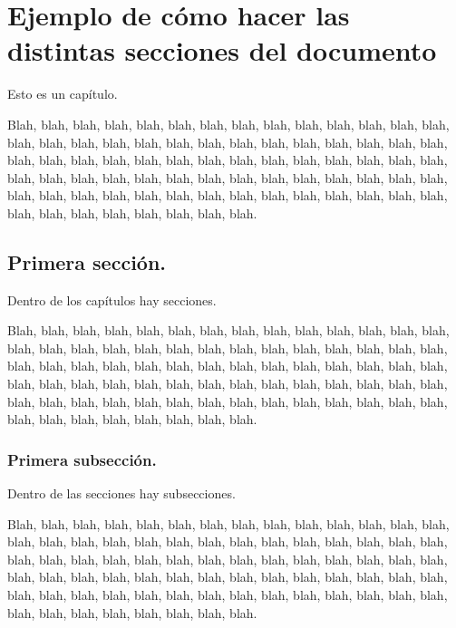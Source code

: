 \chapter{Ejemplo de cómo hacer las distintas secciones del documento}

Esto es un capítulo.

Blah, blah, blah, blah, blah, blah, blah, blah, blah, blah, blah, blah, blah,
blah, blah, blah, blah, blah, blah, blah, blah, blah, blah, blah, blah, blah,
blah, blah, blah, blah, blah, blah, blah, blah, blah, blah, blah, blah, blah,
blah, blah, blah, blah, blah, blah, blah, blah, blah, blah, blah, blah, blah,
blah, blah, blah, blah, blah, blah, blah, blah, blah, blah, blah, blah, blah,
blah, blah, blah, blah, blah, blah, blah, blah, blah, blah, blah, blah, blah.

\section{Primera sección.}

Dentro de los capítulos hay secciones.

Blah, blah, blah, blah, blah, blah, blah, blah, blah, blah, blah, blah, blah,
blah, blah, blah, blah, blah, blah, blah, blah, blah, blah, blah, blah, blah,
blah, blah, blah, blah, blah, blah, blah, blah, blah, blah, blah, blah, blah,
blah, blah, blah, blah, blah, blah, blah, blah, blah, blah, blah, blah, blah,
blah, blah, blah, blah, blah, blah, blah, blah, blah, blah, blah, blah, blah,
blah, blah, blah, blah, blah, blah, blah, blah, blah, blah, blah, blah, blah.

\subsection{Primera subsección.}

Dentro de las secciones  hay subsecciones.

Blah, blah, blah, blah, blah, blah, blah, blah, blah, blah, blah, blah, blah,
blah, blah, blah, blah, blah, blah, blah, blah, blah, blah, blah, blah, blah,
blah, blah, blah, blah, blah, blah, blah, blah, blah, blah, blah, blah, blah,
blah, blah, blah, blah, blah, blah, blah, blah, blah, blah, blah, blah, blah,
blah, blah, blah, blah, blah, blah, blah, blah, blah, blah, blah, blah, blah,
blah, blah, blah, blah, blah, blah, blah, blah, blah, blah, blah, blah, blah.

